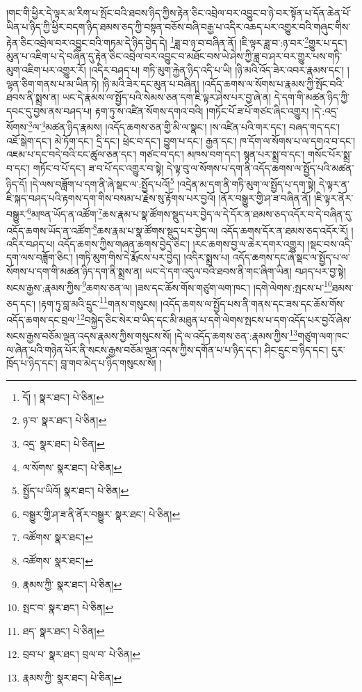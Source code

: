 །གང་གི་ཕྱིར་དེ་ལྟར་མ་རིག་པ་སྤོང་བའི་ཐབས་ཉིད་ཀྱིས་རྟེན་ཅིང་འབྲེལ་བར་འབྱུང་བ་ཉེ་བར་སྟོན་པ་དོན་ཆེན་པོ་ཡིན་པ་ཉིད་ཀྱི་ཕྱིར་བདག་ཉིད་ཐམས་ཅད་ཀྱི་བསྟན་བཅོས་བཞི་བརྒྱ་པ་འདིར་འཆད་པར་འགྱུར་བའི་གཞུང་གིས་རྟེན་ཅིང་འབྲེལ་བར་འབྱུང་བའི་གཏམ་དེ་ཉིད་བྱེད་དེ། \footnote{དོ། །   སྣར་ཐང་།  པེ་ཅིན། }ཟླ་བ་ཉ་བ་བཞིན་ནོ། །ཇི་ལྟར་ཟླ་བ་:ཉ་བར་\footnote{ཉ་བ་  སྣར་ཐང་།  པེ་ཅིན། }གྱུར་པ་དང་། མུན་པ་འཇིག་པ་དེ་བཞིན་དུ་རྟེན་ཅིང་འབྲེལ་བར་འབྱུང་བ་མཐོང་བས་ཡེ་ཤེས་ཀྱི་ཟླ་བ་ཤར་བར་གྱུར་པས་གཏི་མུག་འཇིག་པར་འགྱུར་རོ། །འདིར་བཤད་པ། གཏི་མུག་རྐྱེན་ཉིད་འདི་པ་ཡི། །ཉི་མའི་འོད་ཟེར་འབར་རྣམས་དང་། །ལྷན་ཅིག་གནས་པ་མ་ཡིན་ཏེ། །ཉི་མའི་ཟེར་དང་མུན་པ་བཞིན། །འདོད་ཆགས་ལ་སོགས་པ་རྣམས་ཀྱི་སྤོང་བའི་ཐབས་ནི་སྨྲས་ན། ཡང་དེ་རྣམས་ལ་སྤྱོད་པའི་སེམས་ཅན་དག་ཇི་ལྟར་ཤེས་པར་བྱ་ཞེ་ན། དེ་དག་གི་མཚན་ཉིད་ཀྱི་དབང་དུ་བྱས་ནས་བཤད་པ། རྟག་ཏུ་ས་འཛིན་སོགས་དགའ་བའི། །གཏོང་པོ་ཟ་པོ་གཙང་ཞིང་འགྱུར། །དེ་:འདྲ་སོགས་\footnote{འདྲ་  སྣར་ཐང་།  པེ་ཅིན། }ལ་\footnote{ལ་སོགས་  སྣར་ཐང་།  པེ་ཅིན། }མཚན་ཉིད་རྣམས། །འདོད་ཆགས་ཅན་གྱི་མི་ལ་སྣང་། །ས་འཛིན་པའི་གར་དང་། བཞད་གད་དང་། འཇོ་སྒེག་དང་། མེ་ཏོག་དང་། དྲི་དང་། ཕྲེང་བ་དང་། བྱུག་པ་དང་། རྒྱན་དང་། ཁ་དོག་ལ་སོགས་པ་ལ་དགའ་བ་དང་། འཇམ་པ་དང་བདེ་བའི་ངང་ཚུལ་ཅན་དང་། གཙང་བ་དང་། མཁས་བག་དང་། སྙན་པར་སྨྲ་བ་དང་། གསོང་པོར་སྨྲ་བ་དང་། གཏོང་བ་པོ་དང་། ཟ་བ་པོ་དང་འགྱུར་བ་སྟེ། དེ་ལྟ་བུ་ལ་སོགས་པ་དག་ནི་འདོད་ཆགས་ལ་སྤྱོད་པའི་མཚན་ཉིད་དོ། །དེ་ལས་བཟློག་པ་དག་ནི་ཞེ་སྡང་ལ་:སྤྱོད་པའོ།\footnote{སྤྱོད་པ་ཡིའོ།  སྣར་ཐང་།  པེ་ཅིན། } །འདྲེན་མ་དག་ནི་གཏི་མུག་ལ་སྤྱོད་པ་དག་སྟེ། དེ་ལྟར་ན་ཇི་སྐད་བཤད་པའི་རྟགས་དག་གིས་བསམ་པ་རྗེས་སུ་རྟོགས་པར་བྱའོ། །ནོར་བསྒྱུར་གྱི་ཤ་ཟ་བཞིན་ནོ། །ཇི་ལྟར་ནོར་བསྒྱུར་\footnote{བསྒྱུར་གྱི་ཤ་ཟ་ནི་ནོར་བསྒྱུར་  སྣར་ཐང་།  པེ་ཅིན། }མཁན་ཡོད་ན་འཚོག་\footnote{འཚོགས་  སྣར་ཐང་། }ཆས་རྣམ་པ་སྣ་ཚོགས་སྡུད་པར་བྱེད་ལ་དེ་དོར་ན་ཐམས་ཅད་འདོར་བ་དེ་བཞིན་དུ་འདོད་ཆགས་ཡོད་ན་འཚོག་\footnote{འཚོགས་  སྣར་ཐང་། }ཆས་རྣམ་པ་སྣ་ཚོགས་སྡུད་པར་བྱེད་ལ། འདོད་ཆགས་དོར་ན་ཐམས་ཅད་འདོར་རོ། །འདིར་བཤད་པ། འདོད་ཆགས་ཀྱིས་གཞན་ཆགས་བྱེད་ཅིང་། །རང་ཆགས་བྱ་ལ་ཆེར་དགར་འགྱུར། །སྡང་བས་འདི་དག་ལས་བཟློག་ཅིང་། །གཏི་མུག་གིས་དེ་རྨོངས་པར་བྱེད། །འདིར་སྨྲས་པ། འདོད་ཆགས་དང་ཞེ་སྡང་ལ་སྤྱོད་པ་ལ་སོགས་པ་དག་གི་མཚན་ཉིད་དག་ནི་སྨྲས་ན། ཡང་དེ་དག་འདུལ་བའི་ཐབས་ནི་གང་ཞིག་ཡིན། བཤད་པར་བྱ་སྟེ། སངས་རྒྱས་:རྣམས་ཀྱིས་\footnote{རྣམས་ཀྱི་  སྣར་ཐང་།  པེ་ཅིན། }ཆགས་ཅན་ལ། །ཟས་དང་ཆོས་གོས་གཙུག་ལག་ཁང་། །དགེ་ལེགས་:སྤངས་པ་\footnote{སྤང་བ་  སྣར་ཐང་།  པེ་ཅིན། }ཐམས་ཅད་དང་། །རྟག་ཏུ་བླ་མའི་དྲུང་\footnote{ཐད་  སྣར་ཐང་།  པེ་ཅིན། }གནས་གསུངས། །འདོད་ཆགས་ལ་སྤྱོད་པས་ནི་གནས་དང་ཟས་དང་ཆོས་གོས་འདོད་ཆགས་དང་བྲལ་\footnote{བྲབ་པ་  སྣར་ཐང་། བྲལ་བ་  པེ་ཅིན། }བསྐྱེད་ཅིང་སེར་བ་ཡིད་དང་མི་མཐུན་པ་དགེ་ལེགས་སྤངས་པ་དག་འདོད་པར་བྱའོ་ཞེས་སངས་རྒྱས་བཅོམ་ལྡན་འདས་རྣམས་ཀྱིས་གསུངས་སོ། །དེ་ལ་འདོད་ཆགས་ཅན་:རྣམས་ཀྱིས་\footnote{རྣམས་ཀྱི་  སྣར་ཐང་།  པེ་ཅིན། }གཙུག་ལག་ཁང་ལ་ཞེན་པའི་གཉེན་པོར་ནི་སངས་རྒྱས་བཅོམ་ལྡན་འདས་ཀྱིས་དགོན་པ་པ་ཉིད་དང་། ཤིང་དྲུང་བ་ཉིད་དང་། དུར་ཁྲོད་པ་ཉིད་དང་། བླ་གབ་མེད་པ་ཉིད་གསུངས་སོ། །
